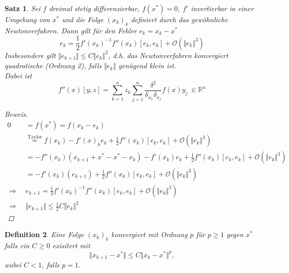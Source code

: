 \documentclass[12pt]{article}
\theoremstyle{break}
\newtheorem{theorem}{Satz}[subsection]
\newtheorem{definition}[theorem]{Definition}
\begin{document}
\begin{theorem}
Sei $f$ dreimal stetig differenzierbar, $f(x^*) = 0$, $f'$ invertierbar in einer Umgebung von $x^*$ und die Folge $(x_k)_k$ definiert durch das gewöhnliche Newtonverfahren. Dann gilt für den Fehler $e_k = x_k - x^*$
$$e_k = \frac{1}{2} f'(x_k)^{-1} f''(x_k)[e_k, e_k] + \mathcal{O}( \Vert e_k \Vert ^3)$$
Insbesondere gilt $\Vert e_{k+1} \Vert \leq C \Vert e_k \Vert ^2$, d.h. das Newtonverfahren konvergiert quadratische (Ordnung 2), falls $\Vert e_k \Vert$ genügend klein ist.\\
Dabei ist 
$$f''(x) [y,z] = \sum_{k=1}^n z_k \sum_{j=1}^n \frac{\delta^2}{\delta_{x_k} \delta_{x_j}} f(x) y_j \medspace \in \mathbb{R}^n$$ 
\begin{proof}[Beweis]\leavevmode \\
\begin{align*}
0 &= f(x^*) = f(x_k - e_k) &\\
&\overset{\text{Taylor}}{=} f(x_k) - f'(x)_ke_k + \frac{1}{2} f''(x_k) [e_k, e_k] + \mathcal{O}(\Vert e_k \Vert ^3) &\\
&= -f''(x_k) (x_{k+1} + x^* - x^* - x_k) - f'(x_k) e_k + \frac{1}{2} f''(x_k) [e_k, e_k] + \mathcal{O}(\Vert e_k \Vert ^3) &\\
&= -f'(x_k) (e_{k+1}) + \frac{1}{2} f''(x_k)[e_k, e_k] + \mathcal{O}(\Vert e_k \Vert ^3) &\\
\Rightarrow \medspace &e_{k+1} = \frac{1}{2} f'(x_k)^{-1} f''(x_k)[e_k, e_k] + \mathcal{O}(\Vert e_k \Vert ^3) &\\
\Rightarrow \medspace &\Vert e_{k+1} \Vert \leq \frac{1}{2} C \Vert e_k \Vert ^2
\end{align*}
\end{proof}
\end{theorem}

\begin{definition}
Eine Folge $(x_k)_k$ konvergiert mit Ordnung $p$ für $p \geq 1$ gegen $x^*$ falls ein $C \geq 0$ exisitert mit
$$ \Vert x_{k+1} - x^* \Vert \leq C \Vert x_k - x^* \Vert ^p,$$
wobei $C < 1$, falls $p=1$.
\end{definition}
\end{document}
